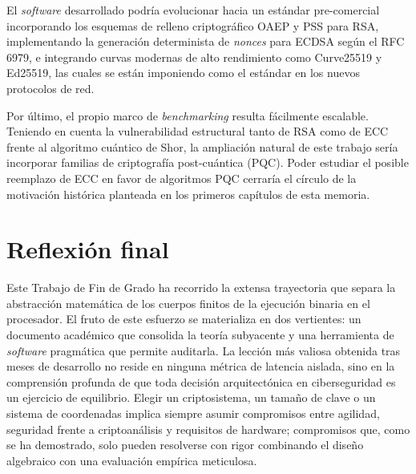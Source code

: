 El \textit{software} desarrollado podría evolucionar hacia un estándar pre-comercial incorporando los esquemas de relleno criptográfico OAEP y PSS para RSA, implementando la generación determinista 
de \textit{nonces} para ECDSA según el RFC 6979, e integrando curvas modernas de alto rendimiento como Curve25519 y Ed25519, las cuales se están imponiendo como el estándar en los nuevos 
protocolos de red.

Por último, el propio marco de \textit{benchmarking} resulta fácilmente escalable. Teniendo en cuenta la vulnerabilidad estructural tanto de RSA como de ECC frente al algoritmo cuántico de Shor, la ampliación natural de este trabajo sería incorporar familias de criptografía post-cuántica (PQC). Poder estudiar el posible reemplazo de ECC en favor de algoritmos PQC cerraría el círculo de la motivación histórica planteada en los primeros capítulos de esta memoria.

\section{Reflexión final}
\label{sec:conc-reflexion}

Este Trabajo de Fin de Grado ha recorrido la extensa trayectoria que separa la abstracción matemática de los cuerpos finitos de la ejecución binaria en el procesador. El fruto de este esfuerzo se materializa en dos vertientes: un documento académico que consolida la teoría subyacente y una herramienta de \textit{software} pragmática que permite auditarla. La lección más valiosa obtenida tras meses de desarrollo no reside en ninguna métrica de latencia aislada, sino en la comprensión profunda de que toda decisión arquitectónica en ciberseguridad es un ejercicio de equilibrio. Elegir un criptosistema, un tamaño de clave o un sistema de coordenadas implica siempre asumir compromisos entre agilidad, seguridad frente a criptoanálisis y requisitos de hardware; compromisos que, como se ha demostrado, solo pueden resolverse con rigor combinando el diseño algebraico con una evaluación empírica meticulosa. 
